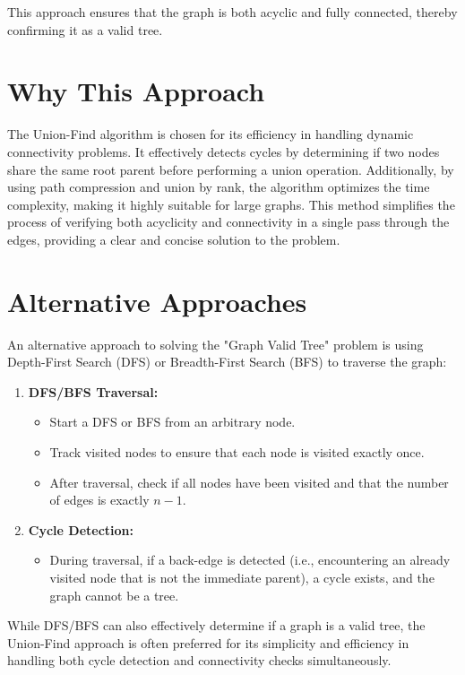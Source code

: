 This approach ensures that the graph is both acyclic and fully connected, thereby confirming it as a valid tree.

\section*{Why This Approach}

The Union-Find algorithm is chosen for its efficiency in handling dynamic connectivity problems. It effectively detects cycles by determining if two nodes share the same root parent before performing a union operation. Additionally, by using path compression and union by rank, the algorithm optimizes the time complexity, making it highly suitable for large graphs. This method simplifies the process of verifying both acyclicity and connectivity in a single pass through the edges, providing a clear and concise solution to the problem.

\section*{Alternative Approaches}

An alternative approach to solving the "Graph Valid Tree" problem is using Depth-First Search (DFS) or Breadth-First Search (BFS) to traverse the graph:

\begin{enumerate}
    \item \textbf{DFS/BFS Traversal:}
    \begin{itemize}
        \item Start a DFS or BFS from an arbitrary node.
        \item Track visited nodes to ensure that each node is visited exactly once.
        \item After traversal, check if all nodes have been visited and that the number of edges is exactly \( n - 1 \).
    \end{itemize}
    
    \item \textbf{Cycle Detection:}
    \begin{itemize}
        \item During traversal, if a back-edge is detected (i.e., encountering an already visited node that is not the immediate parent), a cycle exists, and the graph cannot be a tree.
    \end{itemize}
\end{enumerate}

While DFS/BFS can also effectively determine if a graph is a valid tree, the Union-Find approach is often preferred for its simplicity and efficiency in handling both cycle detection and connectivity checks simultaneously.

